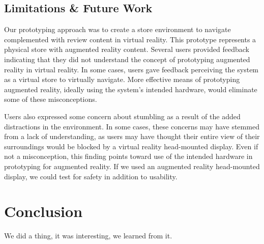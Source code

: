 \subsection{Limitations \& Future Work}
Our prototyping approach was to create a store environment to navigate complemented with review content in virtual reality.  This prototype represents a physical store with augmented reality content.  Several users provided feedback indicating that they did not understand the concept of prototyping augmented reality in virtual reality.  In some cases, users gave feedback perceiving the system as a virtual store to virtually navigate.  More effective means of prototyping augmented reality, ideally using the system's intended hardware, would eliminate some of these misconceptions.

Users also expressed some concern about stumbling as a result of the added distractions in the environment.  In some cases, these concerns may have stemmed from a lack of understanding, as users may have thought their entire view of their surroundings would be blocked by a virtual reality head-mounted display.  Even if not a misconception, this finding points toward use of the intended hardware in prototyping for augmented reality.  If we used an augmented reality head-mounted display, we could test for safety in addition to usability.

\section{Conclusion}
We did a thing, it was interesting, we learned from it.